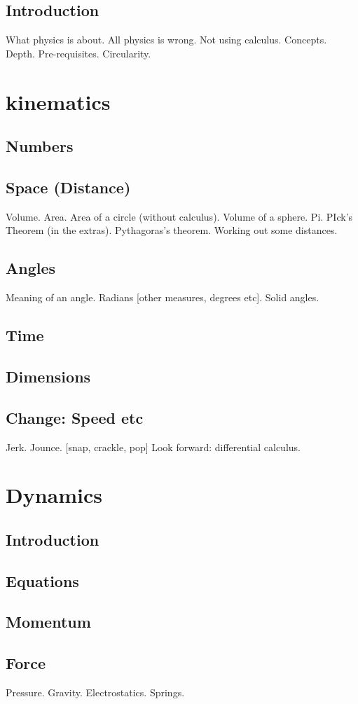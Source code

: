 \documentclass[main.tex]{subfiles}
\begin{document}
\chapter{Introduction}
What physics is about. All physics is wrong.
Not using calculus. Concepts. Depth. Pre-requisites. Circularity.
\part{kinematics}
\chapter{Numbers}
\chapter{Space (Distance)}
Volume. Area. Area of a circle (without calculus). Volume of a sphere. Pi. PIck's Theorem (in the extras). Pythagoras's theorem. Working out some distances.
\chapter{Angles}
Meaning of an angle. Radians [other measures, degrees etc]. Solid angles.
\chapter{Time}
\chapter{Dimensions}
\chapter{Change: Speed etc}
Jerk. Jounce. [snap, crackle, pop]
Look forward: differential calculus.
\part{Dynamics}
\chapter{Introduction}
\chapter{Equations}
\chapter{Momentum}
\chapter{Force}
Pressure. Gravity. Electrostatics. Springs.
\end{document}
